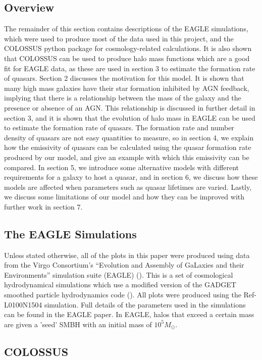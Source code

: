 \documentclass[12pt, twocolumn]{article}%
\begin{document}
\subsection{Overview}

The remainder of this section contains descriptions of the EAGLE simulations, which were used to produce most of the data used in this project, and the COLOSSUS python package for cosmology-related calculations. It is also shown that COLOSSUS can be used to produce halo mass functions which are a good fit for EAGLE data, as these are used in section 3 to estimate the formation rate of quasars. Section 2 discusses the motivation for this model. It is shown that many high mass galaxies have their star formation inhibited by AGN feedback, implying that there is a relationship between the mass of the galaxy and the presence or absence of an AGN. This relationship is discussed in further detail in section 3, and it is shown that the evolution of halo mass in EAGLE can be used to estimate the formation rate of quasars. The formation rate and number density of quasars are not easy quantities to measure, so in section 4, we explain how the emissivity of quasars can be calculated using the quasar formation rate produced by our model, and give an example with which this emissivity can be compared. In section 5, we introduce some alternative models with different requirements for a galaxy to host a quasar, and in section 6, we discuss how these models are affected when parameters such as quasar lifetimes are varied. Lastly, we discuss some limitations of our model and how they can be improved with further work in section 7.

\subsection{The EAGLE Simulations}

Unless stated otherwise, all of the plots in this paper were produced using data from the Virgo Consortium’s “Evolution and Assembly of GaLaxies and their Environments” simulation suite (EAGLE) (\cite{EAGLE}). This is a set of cosmological hydrodynamical simulations which use a modified version of the GADGET smoothed particle hydrodynamics code (\cite{GADGET}). All plots were produced using the Ref-L0100N1504 simulation. Full details of the parameters used in the simulations can be found in the EAGLE paper. In EAGLE, halos that exceed a certain mass are given a 'seed' SMBH with an initial mass of $10^5M_\odot$.

\subsection{COLOSSUS}
\end{document}

